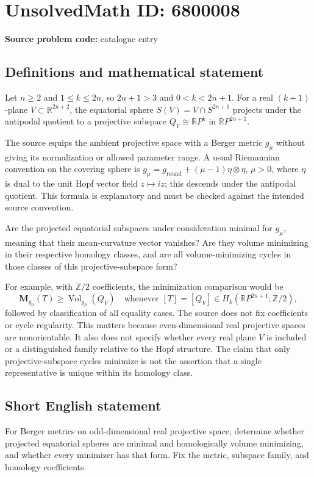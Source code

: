 \documentclass[11pt]{article}
\begin{document}
\section*{UnsolvedMath ID: 6800008}
\textbf{Source problem code:} catalogue entry
\subsection{Definitions and mathematical statement}
Let $n\geq2$ and $1\leq k\leq2n$, so $2n+1>3$ and $0<k<2n+1$. For a real $(k+1)$-plane $V\subset\mathbb R^{2n+2}$, the equatorial sphere $S(V)=V\cap S^{2n+1}$ projects under the antipodal quotient to a projective subspace $Q_V\cong\mathbb RP^k$ in $\mathbb RP^{2n+1}$.

The source equips the ambient projective space with a Berger metric $g_\mu$ without giving its normalization or allowed parameter range. A usual Riemannian convention on the covering sphere is $g_\mu=g_{\mathrm{round}}+(\mu-1)\eta\otimes\eta$, $\mu>0$, where $\eta$ is dual to the unit Hopf vector field $z\mapsto iz$; this descends under the antipodal quotient. This formula is explanatory and must be checked against the intended source convention.

Are the projected equatorial subspaces under consideration minimal for $g_\mu$, meaning that their mean-curvature vector vanishes? Are they volume minimizing in their respective homology classes, and are all volume-minimizing cycles in those classes of this projective-subspace form?

For example, with $\mathbb Z/2$ coefficients, the minimization comparison would be
\[
\mathbf M_{g_\mu}(T)\geq\operatorname{Vol}_{g_\mu}(Q_V)
\quad\text{whenever }[T]=[Q_V]\in H_k(\mathbb RP^{2n+1};\mathbb Z/2),
\]
followed by classification of all equality cases. The source does not fix coefficients or cycle regularity. This matters because even-dimensional real projective spaces are nonorientable. It also does not specify whether every real plane $V$ is included or a distinguished family relative to the Hopf structure. The claim that only projective-subspace cycles minimize is not the assertion that a single representative is unique within its homology class.
\subsection{Short English statement}
For Berger metrics on odd-dimensional real projective space, determine whether projected equatorial spheres are minimal and homologically volume minimizing, and whether every minimizer has that form. Fix the metric, subspace family, and homology coefficients.
\end{document}
